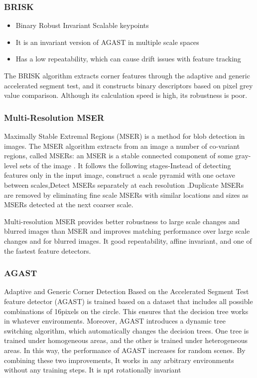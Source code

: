 \documentclass{article}[11pt]
\begin{document}
\subsubsection{BRISK}
\begin{itemize}
    \item Binary Robust Invariant Scalable keypoints 
    \item It is an invariant version of AGAST in multiple scale spaces
    \item Has a low repeatability, which can cause drift issues with feature tracking
    
\end{itemize}
The BRISK algorithm extracts corner features through the adaptive and generic accelerated segment test, and it constructs binary descriptors based on pixel grey value comparison. Although its calculation speed is high, its robustness is poor.



\subsubsection{Multi-Resolution MSER}
Maximally Stable Extremal Regions (MSER) is a method for blob detection in images. The MSER algorithm extracts from an image a number of co-variant regions, called MSERs: an MSER is a stable connected component of
some gray-level sets of the image . It follows the following stages-Instead of detecting features only in the input image, construct a scale pyramid with one octave between scales,Detect MSERs separately at each resolution
.Duplicate MSERs are removed by eliminating fine scale MSERs with similar locations and sizes as MSERs detected at the next coarser scale.

Multi-resolution MSER provides better robustness to large scale changes and blurred images than MSER
and improves matching performance over large scale changes and for blurred images. It good repeatability, affine invariant, and one of the fastest feature detectors.


\subsubsection{AGAST}

 Adaptive and Generic Corner Detection Based on the Accelerated Segment Test feature detector (AGAST) is trained based on a dataset that includes all possible combinations of 16pixels on the circle. This ensures that the decision tree works in whatever environments. Moreover, AGAST introduces a dynamic tree switching algorithm, which automatically changes the decision trees. One tree is trained under homogeneous areas, and the other is trained under heterogeneous areas. In this way, the performance of AGAST increases for random scenes. By combining these two improvements, It works in any arbitrary environments without any training steps. It is npt rotationally invariant
\end{document}
